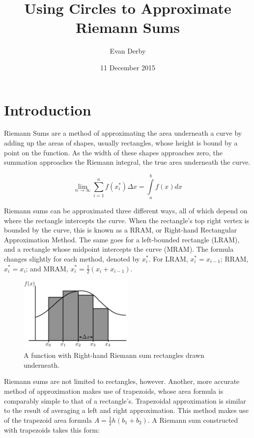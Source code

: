\documentclass{article}
\begin{document}
  \title{Using Circles to Approximate Riemann Sums}
  \author{Evan Derby}
  \date{11 December 2015}
  \maketitle

  \section{Introduction}
    Riemann Sums are a method of approximating the area underneath a curve by
    adding up the areas of shapes, usually rectangles, whose height is bound by
    a point on the function. As the width of these shapes approaches zero, the
    summation approaches the Riemann integral, the true area underneath the
    curve.

    \[ \displaystyle\lim_{n \to \infty}\sum_{i=1}^{n} f(x^*_i) \Delta x = \int\limits_a^b f(x)dx \]

    Riemann sums can be approximated three different ways, all of which depend on
    where the rectangle intercepts the curve. When the rectangle's top right
    vertex is bounded by the curve, this is known as a RRAM, or Right-hand
    Rectangular Approximation Method. The same goes for a left-bounded rectangle
     (LRAM), and a rectangle whose midpoint intercepts the curve (MRAM). The
    formula changes slightly for each method, denoted by \( x^*_i \). For LRAM,
    \( x_i^* = x_{i-1} \); RRAM, \( x_i^* = x_i \); and MRAM, \( x_i^* = \frac{1}{2}(x_i + x_{i-1}) \).

    \begin{figure}[h]
      \centering
      \includegraphics[width=0.5\textwidth]{riemann_1}
      \caption{A function with Right-hand Riemann sum rectangles drawn underneath.}
    \end{figure}

    Riemann sums are not limited to rectangles, however. Another, more accurate method of
    approximation makes use of trapezoids, whose area formula is comparably
    simple to that of a rectangle's. Trapezoidal approximation is similar to
    the result of averaging a left and right approximation. This method makes
    use of the trapezoid area formula \( A = \frac{1}{2}h(b_1+b_2) \). A Riemann
    sum constructed with trapezoids takes this form:
\end{document}
